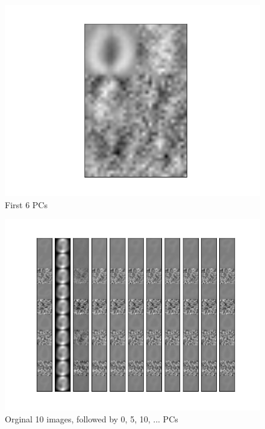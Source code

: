 \documentclass[a4paper,11pt]{article}
\begin{document}
\begin{figure}[H]
  \includegraphics[width=\linewidth]{5_b_c_23479.png}
  \caption{First 6 PCs}
\endminipage
\end{figure}

\begin{figure}[H]
  \includegraphics[width=\linewidth]{5_c_Xprime_23479_45_allinone.png}
  \caption{Orginal 10 images, followed by 0, 5, 10, ... PCs}\label{fig:6}
\end{figure}

\clearpage
\end{document}
